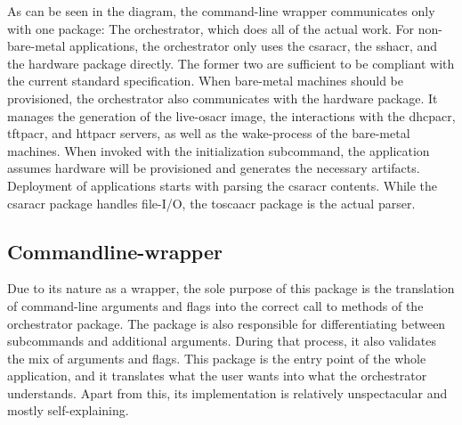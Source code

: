 As can be seen in the diagram, the command-line wrapper communicates only with one package: The orchestrator, which does all of the actual work. For non-bare-metal applications, the orchestrator only uses the \gls{csaracr}, the \gls{sshacr}, and the hardware package directly. The former two are sufficient to be compliant with the current standard specification. When bare-metal machines should be provisioned, the orchestrator also communicates with the hardware package. It manages the generation of the live-\gls{osacr} image, the interactions with the \gls{dhcpacr}, \gls{tftpacr}, and \gls{httpacr} servers, as well as the wake-process of the bare-metal machines.
\newline
When invoked with the initialization subcommand, the application assumes hardware will be provisioned and generates the necessary artifacts.
\newline
Deployment of applications starts with parsing the \gls{csaracr} contents. While the \gls{csaracr} package handles file-I/O, the \gls{toscaacr} package is the actual parser.

\subsection{Commandline-wrapper}
Due to its nature as a wrapper, the sole purpose of this package is the translation of command-line arguments and flags into the correct call to methods of the orchestrator package. The package is also responsible for differentiating between subcommands and additional arguments. During that process, it also validates the mix of arguments and flags.
\newline
This package is the entry point of the whole application, and it translates what the user wants into what the orchestrator understands. Apart from this, its implementation is relatively unspectacular and mostly self-explaining.

